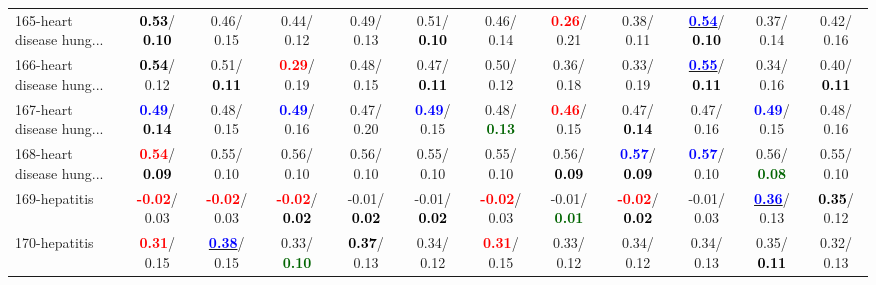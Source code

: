 \begin{table}[h]
\begin{center}
{\begin{tabular}{lc|c|c|c|c|c|c|c|c|c|c}
165-heart disease hung... & \textcolor{black}{\textbf{  0.53}}/\textcolor{black}{\textbf{  0.10}} &   0.46/  0.15 &   0.44/  0.12 &   0.49/  0.13 &   0.51/\textcolor{black}{\textbf{  0.10}} &   0.46/  0.14 & \textcolor{red}{\textbf{  0.26}}/  0.21 &   0.38/  0.11 & \underline{\textcolor{blue}{\textbf{  0.54}}}/\textcolor{black}{\textbf{  0.10}} &   0.37/  0.14 &   0.42/  0.16 \\
166-heart disease hung... & \textcolor{black}{\textbf{  0.54}}/  0.12 &   0.51/\textcolor{black}{\textbf{  0.11}} & \textcolor{red}{\textbf{  0.29}}/  0.19 &   0.48/  0.15 &   0.47/\textcolor{black}{\textbf{  0.11}} &   0.50/  0.12 &   0.36/  0.18 &   0.33/  0.19 & \underline{\textcolor{blue}{\textbf{  0.55}}}/\textcolor{black}{\textbf{  0.11}} &   0.34/  0.16 &   0.40/\textcolor{black}{\textbf{  0.11}} \\
167-heart disease hung... & \textcolor{blue}{\textbf{  0.49}}/\textcolor{black}{\textbf{  0.14}} &   0.48/  0.15 & \textcolor{blue}{\textbf{  0.49}}/  0.16 &   0.47/  0.20 & \textcolor{blue}{\textbf{  0.49}}/  0.15 &   0.48/\textcolor{darkgreen}{\textbf{  0.13}} & \textcolor{red}{\textbf{  0.46}}/  0.15 &   0.47/\textcolor{black}{\textbf{  0.14}} &   0.47/  0.16 & \textcolor{blue}{\textbf{  0.49}}/  0.15 &   0.48/  0.16 \\ \hline
168-heart disease hung... & \textcolor{red}{\textbf{  0.54}}/\textcolor{black}{\textbf{  0.09}} &   0.55/  0.10 &   0.56/  0.10 &   0.56/  0.10 &   0.55/  0.10 &   0.55/  0.10 &   0.56/\textcolor{black}{\textbf{  0.09}} & \textcolor{blue}{\textbf{  0.57}}/\textcolor{black}{\textbf{  0.09}} & \textcolor{blue}{\textbf{  0.57}}/  0.10 &   0.56/\textcolor{darkgreen}{\textbf{  0.08}} &   0.55/  0.10 \\
169-hepatitis & \textcolor{red}{\textbf{ -0.02}}/  0.03 & \textcolor{red}{\textbf{ -0.02}}/  0.03 & \textcolor{red}{\textbf{ -0.02}}/\textcolor{black}{\textbf{  0.02}} &  -0.01/\textcolor{black}{\textbf{  0.02}} &  -0.01/\textcolor{black}{\textbf{  0.02}} & \textcolor{red}{\textbf{ -0.02}}/  0.03 &  -0.01/\textcolor{darkgreen}{\textbf{  0.01}} & \textcolor{red}{\textbf{ -0.02}}/\textcolor{black}{\textbf{  0.02}} &  -0.01/  0.03 & \underline{\textcolor{blue}{\textbf{  0.36}}}/  0.13 & \textcolor{black}{\textbf{  0.35}}/  0.12 \\
170-hepatitis & \textcolor{red}{\textbf{  0.31}}/  0.15 & \underline{\textcolor{blue}{\textbf{  0.38}}}/  0.15 &   0.33/\textcolor{darkgreen}{\textbf{  0.10}} & \textcolor{black}{\textbf{  0.37}}/  0.13 &   0.34/  0.12 & \textcolor{red}{\textbf{  0.31}}/  0.15 &   0.33/  0.12 &   0.34/  0.12 &   0.34/  0.13 &   0.35/\textcolor{black}{\textbf{  0.11}} &   0.32/  0.13 \\

\end{tabular}}
\end{center}
\end{table}

